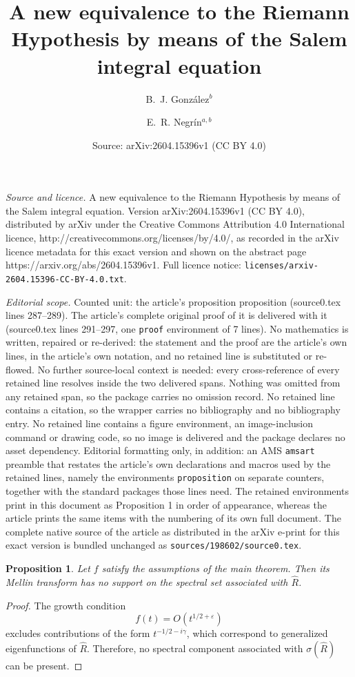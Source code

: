 \documentclass[10pt,a4paper]{amsart}
\title{A new equivalence to the Riemann Hypothesis by means of the Salem integral equation}
\author{B.~J. Gonz\'{a}lez$^b$ \and E.~R. Negr\'{i}n$^{a,b}$}
\date{Source: arXiv:2604.15396v1 (CC BY 4.0)}
\newtheorem{proposition}{Proposition}
\begin{document}
\maketitle

\noindent\emph{Source and licence.} A new equivalence to the Riemann Hypothesis by means of the Salem integral equation. Version arXiv:2604.15396v1 (CC BY 4.0), distributed by arXiv under the Creative Commons Attribution 4.0 International licence, http://creativecommons.org/licenses/by/4.0/, as recorded in the arXiv licence metadata for this exact version and shown on the abstract page https://arxiv.org/abs/2604.15396v1. Full licence notice: \texttt{licenses/arxiv-2604.15396-CC-BY-4.0.txt}.\par\smallskip

\noindent\textit{Editorial scope.} Counted unit: the article's proposition proposition (source0.tex lines 287--289). The article's complete original proof of it is delivered with it (source0.tex lines 291--297, one \texttt{proof} environment of 7 lines). No mathematics is written, repaired or re-derived: the statement and the proof are the article's own lines, in the article's own notation, and no retained line is substituted or re-flowed.  No further source-local context is needed: every cross-reference of every retained line resolves inside the two delivered spans.  Nothing was omitted from any retained span, so the package carries no omission record.  No retained line contains a citation, so the wrapper carries no bibliography and no bibliography entry.  No retained line contains a figure environment, an image-inclusion command or drawing code, so no image is delivered and the package declares no asset dependency.  Editorial formatting only, in addition: an AMS \texttt{amsart} preamble that restates the article's own declarations and macros used by the retained lines, namely the environments \texttt{proposition} on separate counters, together with the standard packages those lines need.  The retained environments print in this document as Proposition 1 in order of appearance, whereas the article prints the same items with the numbering of its own full document.  The complete native source of the article as distributed in the arXiv e-print for this exact version is bundled unchanged as \texttt{sources/198602/source0.tex}.
\begin{proposition}
Let $f$ satisfy the assumptions of the main theorem. Then its Mellin transform has no support on the spectral set associated with $\widehat{R}$.
\end{proposition}

\begin{proof}
The growth condition
\[
f(t)=O(t^{1/2+\varepsilon})
\]
excludes contributions of the form $t^{-1/2-i\gamma}$, which correspond to generalized eigenfunctions of $\widehat{R}$. Therefore, no spectral component associated with $\sigma(\widehat{R})$ can be present.
\end{proof}
\end{document}
